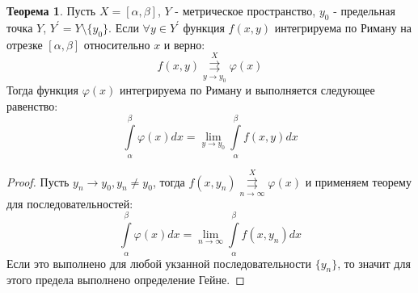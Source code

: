 \documentclass[12pt]{article}
\theoremstyle{definition}
\newtheorem{theorem}{Теорема}
\newcommand{\ddint}[2]{\displaystyle\int\limits_{#1}^{#2}}
\newcommand{\uconvm}[2]{\overset{#1}{\underset{#2}{\rightrightarrows}}}
\begin{document}
\begin{theorem}
	Пусть $X = [\alpha, \beta]$, $Y$ - метрическое пространство, $y_0$ - предельная точка $Y$, $Y^\prime = Y \setminus \{y_0\}$. Если $\forall y \in Y^\prime$ функция $f(x,y)$ интегрируема по Риману на отрезке $[\alpha,\beta]$ относительно $x$ и верно:
	$$
		f(x,y) \uconvm{X}{y \to y_0} \varphi(x)
	$$
	Тогда функция $\varphi(x)$ интегрируема по Риману и выполняется следующее равенство:
	$$
		\ddint{\alpha}{\beta}\varphi(x) dx = \lim\limits_{y \to y_0}\ddint{\alpha}{\beta}f(x,y)dx
	$$
\end{theorem}
\begin{proof}
	Пусть $y_n \to y_0, y_n \neq y_0$, тогда $f(x,y_n) \uconvm{X}{n \to \infty}\varphi(x)$ и применяем теорему для последовательностей:
	$$
		\ddint{\alpha}{\beta}\varphi(x) dx = \lim\limits_{n \to \infty}\ddint{\alpha}{\beta}f(x,y_n)dx
	$$
	Если это выполнено для любой укзанной последовательности $\{y_n\}$, то значит для этого предела выполнено определение Гейне.
\end{proof}
\end{document}
